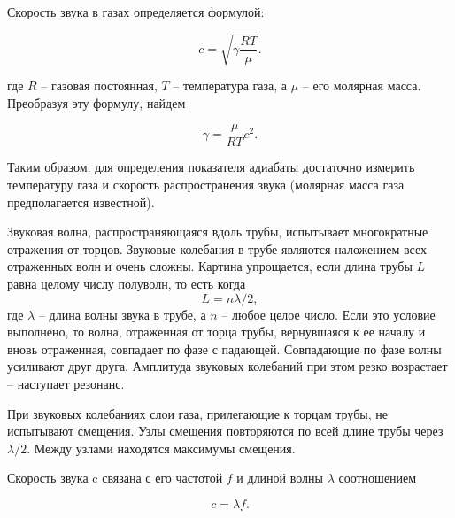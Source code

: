 \documentclass[a4paper,12pt]{article} %
\begin{document}
\medskip

\noindent Скорость звука в газах определяется формулой:

\begin{equation}\label{velocity}
c=\sqrt{\gamma\frac{RT}{\mu}}.
\end{equation}

\noindent где $ R $ -- газовая постоянная, $ T $ -- температура газа, а $ \mu $ -- его молярная масса. Преобразуя эту формулу, найдем

\begin{equation}
\gamma = \frac{\mu}{RT}c^2.
\end{equation}
\medskip

\noindent Таким образом, для определения показателя адиабаты достаточно измерить температуру газа и скорость распространения звука (молярная масса газа предполагается известной).

\medskip

\noindent Звуковая волна, распространяющаяся вдоль трубы, испытывает многократные отражения от торцов. Звуковые колебания в трубе являются наложением всех отраженных волн и очень сложны. Картина упрощается, если длина трубы $ L $ равна целому числу полуволн, то есть когда \[ L=n\lambda/2, \] где $ \lambda $ -- длина волны звука в трубе, а $ n $ -- любое целое число. Если это условие выполнено, то волна, отраженная от торца трубы, вернувшаяся к ее началу и вновь отраженная, совпадает по фазе с падающей. Совпадающие по фазе волны усиливают друг друга. Амплитуда звуковых колебаний при этом резко возрастает -- наступает резонанс.

\medskip

\noindent При звуковых колебаниях слои газа, прилегающие к торцам трубы, не испытывают смещения. Узлы смещения повторяются по всей длине трубы через $ \lambda/2 $. Между узлами находятся максимумы смещения.

\medskip

\noindent Скорость звука c связана с его частотой $ f $ и длиной волны $ \lambda $ соотношением

\begin{equation}\label{lambda_f}
c=\lambda f.
\end{equation}
\end{document}
